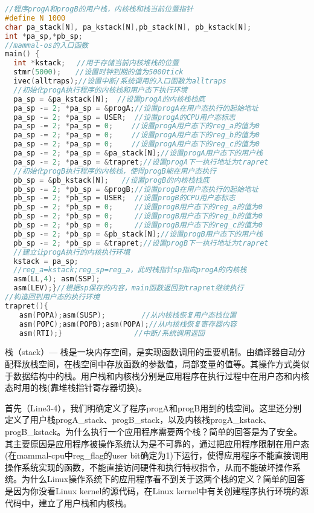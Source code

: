 \begin{lstlisting}[language={C}]
//程序progA和progB的用户栈，内核栈和栈当前位置指针
#define N 1000
char pa_stack[N], pa_kstack[N],pb_stack[N], pb_kstack[N];
int *pa_sp,*pb_sp;
//mammal-os的入口函数
main() {
  int *kstack;　 //用于存储当前内核堆栈的位置　　　　　　　　　　　　　　 
  stmr(5000);　　//设置时钟到期的值为5000tick
  ivec(alltraps);//设置中断/系统调用的入口函数为alltraps
  //初始化progA执行程序的内核栈和用户态下执行环境
  pa_sp = &pa_kstack[N];  //设置progA的内核栈栈底
  pa_sp -= 2; *pa_sp = &progA;//设置progA在用户态执行的起始地址
  pa_sp -= 2; *pa_sp = USER;  //设置progA的CPU用户态标志
  pa_sp -= 2; *pa_sp = 0; 　　//设置progA用户态下的reg_a的值为0
  pa_sp -= 2; *pa_sp = 0; 　　//设置progA用户态下的reg_b的值为0
  pa_sp -= 2; *pa_sp = 0; 　　//设置progA用户态下的reg_c的值为0
  pa_sp -= 2; *pa_sp = &pa_stack[N];//设置progA用户态下的用户栈
  pa_sp -= 2; *pa_sp = &trapret;//设置progA下一执行地址为trapret  
  //初始化progB执行程序的内核栈，使得progB能在用户态执行  
  pb_sp = &pb_kstack[N];   //设置progB的内核栈栈底
  pb_sp -= 2; *pb_sp = &progB;//设置progB在用户态执行的起始地址
  pb_sp -= 2; *pb_sp = USER;  //设置progB的CPU用户态标志
  pb_sp -= 2; *pb_sp = 0;     //设置progB用户态下的reg_a的值为0
  pb_sp -= 2; *pb_sp = 0;     //设置progB用户态下的reg_b的值为0
  pb_sp -= 2; *pb_sp = 0;     //设置progB用户态下的reg_c的值为0
  pb_sp -= 2; *pb_sp = &pb_stack[N];//设置progB用户态下的用户栈
  pb_sp -= 2; *pb_sp = &trapret;//设置progB下一执行地址为trapret
  //建立让progA执行的内核执行环境
  kstack = pa_sp;
  //reg_a=kstack;reg_sp=reg_a，此时栈指针sp指向progA的内核栈
  asm(LL,4); asm(SSP);
  asm(LEV);}//根据sp保存的内容，main函数返回到trapret继续执行 
//构造回到用户态的执行环境
trapret(){
　　asm(POPA);asm(SUSP);　　　　　//从内核栈恢复用户态栈位置
　　asm(POPC);asm(POPB);asm(POPA);//从内核栈恢复寄存器内容
　　asm(RTI);}　　　　　　　　　　//中断/系统调用返回
\end{lstlisting}

\begin{note} 
栈（stack）— 栈是一块内存空间，是实现函数调用的重要机制。由编译器自动分配释放栈空间，在栈空间中存放函数的参数值，局部变量的值等。其操作方式类似于数据结构中的栈。用户栈和内核栈分别是应用程序在执行过程中在用户态和内核态时用的栈(靠堆栈指针寄存器切换)。
\end{note} 

首先（Line3-4），我们明确定义了程序progA和progB用到的栈空间。这里还分别定义了用户栈progA\_stack、progB\_stack，以及内核栈progA\_kstack、progB\_kstack。为什么执行一个应用程序需要两个栈？简单的回答是为了安全。其主要原因是应用程序被操作系统认为是不可靠的，通过把应用程序限制在用户态(在mammal-cpu中reg\_flag的user bit确定为1)下运行，使得应用程序不能直接调用操作系统实现的函数，不能直接访问硬件和执行特权指令，从而不能破坏操作系统。为什么Linux操作系统下的应用程序看不到关于这两个栈的定义？简单的回答是因为你没看Linux kernel的源代码，在Linux kernel中有关创建程序执行环境的源代码中，建立了用户栈和内核栈。

